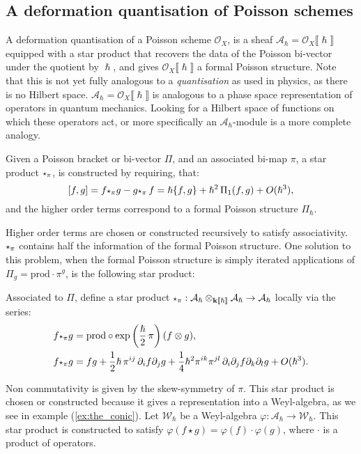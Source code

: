     \subsection{A deformation quantisation of Poisson schemes}
    \label{sec:def_of_pois_sch} 
    
    A deformation quantisation of a Poisson scheme \( \mathcal{O}_X\), is a sheaf \( \mathcal{A}_{\hslash} = \mathcal{O}_X \lBrack \hslash \rBrack \) equipped with a star product \cite{cttaneo_star, k_defofPois, groenewold} that recovers the data of the Poisson bi-vector under the quotient by \(\hslash\), and gives \( \mathcal{O}_X \lBrack \hslash\rBrack\) a formal Poisson structure. Note that this is not yet fully analogous to a \emph{quantisation} as used in physics, as there is no Hilbert space. \( \mathcal{A}_{\hslash}= \mathcal{O}_X \lBrack \hslash \rBrack\) is analogous to a phase space representation of operators in quantum mechanics. Looking for a Hilbert space of functions on which these operators act, or more specifically an \( \mathcal{A}_\hslash\)-module is a more complete analogy. 
    
    Given a Poisson bracket or bi-vector \(\Pi\), and an associated bi-map \( \pi\), a star product \( \starp_{\pi}\), is constructed by requiring, that:
    \[ [f,g] = f \starp_{\pi } g - g \starp_{\pi} \,f = \hslash \{f,g\} + \hslash^2 \,\Pi_{1}(f,g) + O(\hslash^3),   \]
    and the higher order terms correspond to a formal Poisson structure \( \Pi_{\hslash}\).
    
    Higher order terms are chosen or constructed recursively to satisfy associativity. \( \starp_{\pi}\) contains half the information of the formal Poisson structure. One solution to this problem, when the formal Poisson structure is simply iterated applications of \( \Pi_g = \mathrm{prod} \cdot \pi^g \), is the following star product:
    
    \begin{defn} 
    \label{defn:star_prod_pois}
    Associated to \( \Pi\), define a star product \( \starp_{\pi}  : \mathcal{A}_\hslash \otimes_{\mathbf{k}\lBrack \hslash \rBrack}  \mathcal{A}_\hslash \rightarrow \mathcal{A}_\hslash \) locally via the series:
    \begin{align}
    \label{eqn:star_prod}
    f \starp_{\pi} g  &= \mathrm{prod} \circ \exp \left( \frac{\hslash}{2} \,\pi \right) (f \otimes g) , \\
    f \starp_{\pi} g   &= f g + \frac{1}{2} \hslash \,\pi^{ij}\, \partial_i f \partial_j g + \frac{1}{4} \hslash^2 \pi^{ik} \pi^{jl} \, \partial_i \partial_j f \partial_k \partial_l g + O(\hslash^3) . 
    \end{align}
    \end{defn}
    Non commutativity is given by the skew-symmetry of \( \pi \). This star product is chosen or constructed because it gives a representation into a Weyl-algebra, as we see in example (\ref{ex:the_conic}). Let \( \mathcal{W}_{\hslash}\) be a Weyl-algebra \( \varphi : \mathcal{A}_{\hslash} \rightarrow \mathcal{W}_{\hslash}\). This star product is constructed to satisfy \( \varphi( f \star g) = \varphi(f) \cdot \varphi(g)\), where \(\cdot\) is a product of operators.
    
